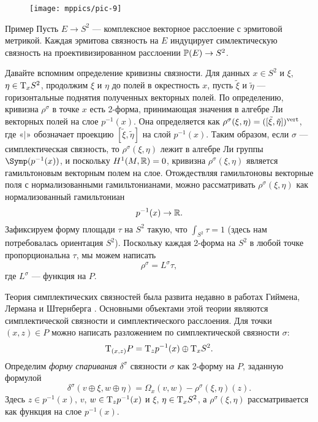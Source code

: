 {

\begin{wrapfigure}[10]{o}{40 mm}
\vskip-0mm
\centering
\texttt{[image: mppics/pic-9]}
\caption{}\label{pic-9}
\vskip0mm
\end{wrapfigure}

\begin{ex*}{Пример}
  Пусть $E \to S^2$ --- комплексное векторное расслоение с эрмитовой
  метрикой.  Каждая эрмитова связность на $E$ индуцирует
  симлектическую связность на проективизированном расслоении $\mathbb{P}(E)
  \to S^2$.
\end{ex*}

Давайте вспомним определение кривизны связности.
Для данных $x\in S^2$ и $\xi$, $\eta \z\in \T_x S^2$, продолжим $\xi$ и $\eta$ до полей в окрестность $x$,
пусть $\tilde\xi$ и $\tilde\eta$ --- горизонтальные поднятия
полученных векторных полей. 
По определению, кривизна $\rho^\sigma$ в точке $x$ есть 2-форма,
принимающая значения в алгебре Ли векторных полей на слое
$p^{-1}(x)$. 
Она определяется как $\rho^\sigma (\xi, \eta) \z= ([\tilde\xi,
  \tilde\eta])^\vert$, где «$\vert$» обозначает проекцию $[\tilde\xi,
  \tilde\eta]$ на слой $p^{-1} (x)$. 
Таким образом, если $\sigma$ --- симплектическая связность, то
$\rho^\sigma (\xi, \eta)$ лежит в алгебре Ли группы
$\Symp(p^{-1}(x))$, и поскольку $H^1 (M, \mathbb{R}) = 0$, кривизна
$\rho^\sigma (\xi, \eta)$ является гамильтоновым векторным полем на
слое. 
Отождествляя гамильтоновы векторные поля с нормализованными
гамильтонианами, можно рассматривать $\rho^\sigma (\xi, \eta)$ как
нормализованный гамильтониан 
\[p^{-1} (x) \to \mathbb{R}.\]
Зафиксируем форму площади $\tau$ на $S^2$ такую, что $\int_{S^2} \tau
= 1$ (здесь нам потребовалась ориентация $S^2$). 
Поскольку каждая 2-форма на $S^2$ в любой точке
пропорциональна $\tau$, мы можем написать
\[\rho^\sigma = L^\sigma \tau,\]
где $L^\sigma$ --- функция на $P$.

}

Теория симплектических связностей была развита недавно в работах
Гиймена, Лермана и Штернберга \cite{GLS,MS}. 
Основными объектами этой теории являются  симплектической связности и  симплектического расслоения. 
Для точки $(x, z) \in P$ можно написать разложением по симплектической
связности $\sigma$: 
\[\mathrm{T}_{(x,z)} P = \mathrm{T}_z p^{-1} (x) \oplus \mathrm{T}_x S^2.\]
Определим \emph{форму спаривания} $\delta^\sigma$ связности $\sigma$
как 2-форму на $P$, заданную формулой  
\[\delta^\sigma (v \oplus \xi, w \oplus \eta) = \Omega_x (v, w) -
\rho^\sigma (\xi, \eta)(z).\] 
Здесь $z \in p^{-1} (x)$, $v$, $w \in \mathrm{T}_z p^{-1} (x)$ и $\xi$, $\eta
\in \mathrm{T}_x S^2$, а $\rho^\sigma (\xi, \eta)$ рассматривается как функция
на слое $p^{-1} (x)$. 

